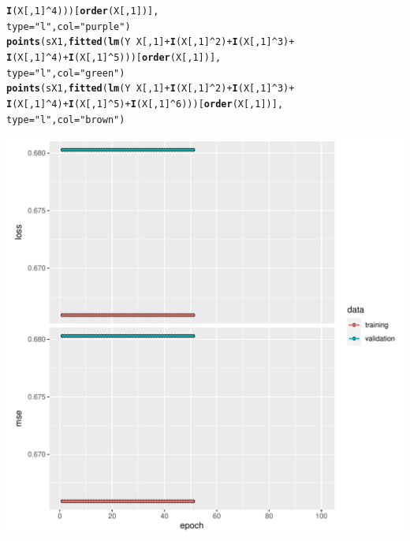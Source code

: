 \documentclass[a4paper]{article}
\makeatletter
\def\maxwidth{ %
  \ifdim\Gin@nat@width>\linewidth
    \linewidth
  \else
    \Gin@nat@width
  \fi
}
\newcommand{\hlnum}[1]{\textcolor[rgb]{0.686,0.059,0.569}{#1}}%
\newcommand{\hlstr}[1]{\textcolor[rgb]{0.192,0.494,0.8}{#1}}%
\newcommand{\hlopt}[1]{\textcolor[rgb]{0,0,0}{#1}}%
\newcommand{\hlstd}[1]{\textcolor[rgb]{0.345,0.345,0.345}{#1}}%
\newcommand{\hlkwc}[1]{\textcolor[rgb]{0.333,0.667,0.333}{#1}}%
\newcommand{\hlkwd}[1]{\textcolor[rgb]{0.737,0.353,0.396}{\textbf{#1}}}%
\newenvironment{kframe}{%
 \def\at@end@of@kframe{}%
 \ifinner\ifhmode%
  \def\at@end@of@kframe{\end{minipage}}%
  \begin{minipage}{\columnwidth}%
 \fi\fi%
 \def\FrameCommand##1{\hskip\@totalleftmargin \hskip-\fboxsep
 \colorbox{shadecolor}{##1}\hskip-\fboxsep
     \hskip-\linewidth \hskip-\@totalleftmargin \hskip\columnwidth}%
 \MakeFramed {\advance\hsize-\width
   \@totalleftmargin\z@ \linewidth\hsize
   \@setminipage}}%
 {\par\unskip\endMakeFramed%
 \at@end@of@kframe}
\newenvironment{knitrout}{}{} %
\makeatother
\begin{document}
{\begin{enumerate}
\begin{itemize}
\begin{knitrout}
\begin{kframe}
\begin{alltt}
                        \hlkwd{I}\hlstd{(X[,}\hlnum{1}\hlstd{]}\hlopt{^}\hlnum{4}\hlstd{)))[}\hlkwd{order}\hlstd{(X[,}\hlnum{1}\hlstd{])],}
       \hlkwc{type}\hlstd{=}\hlstr{"l"}\hlstd{,} \hlkwc{col}\hlstd{=}\hlstr{"purple"}\hlstd{)}
\hlkwd{points}\hlstd{(sX1,} \hlkwd{fitted}\hlstd{(}\hlkwd{lm}\hlstd{(Y} \hlopt{~} \hlstd{X[,}\hlnum{1}\hlstd{]} \hlopt{+} \hlkwd{I}\hlstd{(X[,}\hlnum{1}\hlstd{]}\hlopt{^}\hlnum{2}\hlstd{)} \hlopt{+} \hlkwd{I}\hlstd{(X[,}\hlnum{1}\hlstd{]}\hlopt{^}\hlnum{3}\hlstd{)} \hlopt{+}
                        \hlkwd{I}\hlstd{(X[,}\hlnum{1}\hlstd{]}\hlopt{^}\hlnum{4}\hlstd{)} \hlopt{+} \hlkwd{I}\hlstd{(X[,}\hlnum{1}\hlstd{]}\hlopt{^}\hlnum{5}\hlstd{)))[}\hlkwd{order}\hlstd{(X[,}\hlnum{1}\hlstd{])],}
       \hlkwc{type}\hlstd{=}\hlstr{"l"}\hlstd{,} \hlkwc{col}\hlstd{=}\hlstr{"green"}\hlstd{)}
\hlkwd{points}\hlstd{(sX1,} \hlkwd{fitted}\hlstd{(}\hlkwd{lm}\hlstd{(Y} \hlopt{~} \hlstd{X[,}\hlnum{1}\hlstd{]} \hlopt{+} \hlkwd{I}\hlstd{(X[,}\hlnum{1}\hlstd{]}\hlopt{^}\hlnum{2}\hlstd{)} \hlopt{+} \hlkwd{I}\hlstd{(X[,}\hlnum{1}\hlstd{]}\hlopt{^}\hlnum{3}\hlstd{)} \hlopt{+}
                        \hlkwd{I}\hlstd{(X[,}\hlnum{1}\hlstd{]}\hlopt{^}\hlnum{4}\hlstd{)} \hlopt{+} \hlkwd{I}\hlstd{(X[,}\hlnum{1}\hlstd{]}\hlopt{^}\hlnum{5}\hlstd{)} \hlopt{+} \hlkwd{I}\hlstd{(X[,}\hlnum{1}\hlstd{]}\hlopt{^}\hlnum{6}\hlstd{)))[}\hlkwd{order}\hlstd{(X[,}\hlnum{1}\hlstd{])],}
       \hlkwc{type}\hlstd{=}\hlstr{"l"}\hlstd{,} \hlkwc{col}\hlstd{=}\hlstr{"brown"}\hlstd{)}
\end{alltt}
\end{kframe}
\includegraphics[width=\maxwidth]{figure/unnamed-chunk-10-1} 

\end{knitrout}
\end{itemize}
\end{enumerate}}
\end{document}
